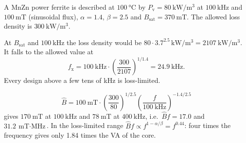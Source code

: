 


A MnZn power ferrite is described at $\SI{100}{\celsius}$ by $P_\mathrm{v}=\SI{80}{\kilo\watt\per\cubic\metre}$ at $\SI{100}{\kilo\hertz}$ and $\SI{100}{\milli\tesla}$ (sinusoidal flux), $\alpha=1.4$, $\beta=2.5$ and $B_\mathrm{sat}=\SI{370}{\milli\tesla}$. The allowed loss density is $\SI{300}{\kilo\watt\per\cubic\metre}$.


\begin{solutionblock}
	At $B_\mathrm{sat}$ and $\SI{100}{\kilo\hertz}$ the loss density would be $80\cdot3.7^{2.5}\,\si{\kilo\watt\per\cubic\metre}=\SI{2107}{\kilo\watt\per\cubic\metre}$. It falls to the allowed value at
	\begin{equation}
		f_\mathrm{x}=\SI{100}{\kilo\hertz}\cdot\left(\frac{300}{2107}\right)^{1/1.4}=\SI{24.9}{\kilo\hertz}.
	\end{equation}
	Every design above a few tens of kHz is loss-limited.
\end{solutionblock}


\begin{solutionblock}
	\begin{equation}
		\hat{B}=\SI{100}{\milli\tesla}\cdot\left(\frac{300}{80}\right)^{1/2.5}\left(\frac{f}{\SI{100}{\kilo\hertz}}\right)^{-1.4/2.5}
	\end{equation}
	gives $\SI{170}{\milli\tesla}$ at $\SI{100}{\kilo\hertz}$ and $\SI{78}{\milli\tesla}$ at $\SI{400}{\kilo\hertz}$, i.e.\ $\hat{B}f=17.0$ and $\SI{31.2}{\milli\tesla\cdot\mega\hertz}$. In the loss-limited range $\hat{B}f\propto f^{1-\alpha/\beta}=f^{0.44}$: four times the frequency gives only 1.84 times the VA of the core.
\end{solutionblock}

